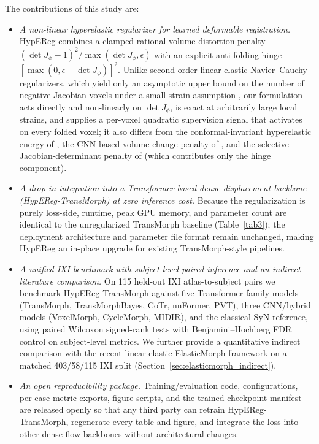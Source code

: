 \documentclass[jimaging,article,submit,pdftex,moreauthors]{Definitions/mdpi}
\begin{document}
The contributions of this study are:
\begin{itemize}
\item \emph{A non-linear hyperelastic regularizer for learned deformable registration.} HypEReg combines a clamped-rational volume-distortion penalty $(\det J_\phi-1)^2/\max(\det J_\phi,\epsilon)$ with an explicit anti-folding hinge $[\max(0,\epsilon-\det J_\phi)]^2$. Unlike second-order linear-elastic Navier--Cauchy regularizers, which yield only an asymptotic upper bound on the number of negative-Jacobian voxels under a small-strain assumption \cite{elasticmorph2025}, our formulation acts directly and non-linearly on $\det J_\phi$, is exact at arbitrarily large local strains, and supplies a per-voxel quadratic supervision signal that activates on every folded voxel; it also differs from the conformal-invariant hyperelastic energy of \citet{zou2023conformal}, the CNN-based volume-change penalty of \citet{hering2021lung}, and the selective Jacobian-determinant penalty of \citet{mok2020fast} (which contributes only the hinge component).
\item \emph{A drop-in integration into a Transformer-based dense-displacement backbone (HypEReg-TransMorph) at zero inference cost.} Because the regularization is purely loss-side, runtime, peak GPU memory, and parameter count are identical to the unregularized TransMorph baseline (Table~\ref{tab3}); the deployment architecture and parameter file format remain unchanged, making HypEReg an in-place upgrade for existing TransMorph-style pipelines.
\item \emph{A unified IXI benchmark with subject-level paired inference and an indirect literature comparison.} On 115 held-out IXI atlas-to-subject pairs we benchmark HypEReg-TransMorph against five Transformer-family models (TransMorph, TransMorphBayes, CoTr, nnFormer, PVT), three CNN/hybrid models (VoxelMorph, CycleMorph, MIDIR), and the classical SyN reference, using paired Wilcoxon signed-rank tests with Benjamini--Hochberg FDR control on subject-level metrics. We further provide a quantitative indirect comparison with the recent linear-elastic ElasticMorph framework \cite{elasticmorph2025} on a matched 403/58/115 IXI split (Section~\ref{sec:elasticmorph_indirect}).
\item \emph{An open reproducibility package.} Training/evaluation code, configurations, per-case metric exports, figure scripts, and the trained checkpoint manifest are released openly so that any third party can retrain HypEReg-TransMorph, regenerate every table and figure, and integrate the loss into other dense-flow backbones without architectural changes.
\end{itemize}
\end{document}
